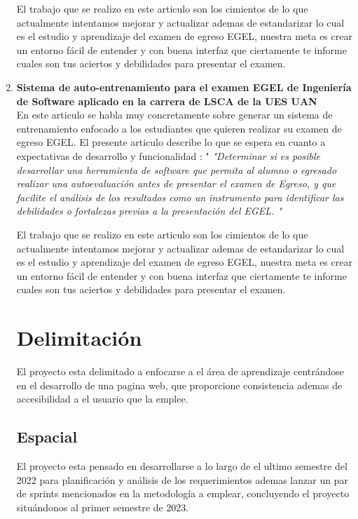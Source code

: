 \documentclass[12pt]{book}
\begin{document}
\begin{enumerate}
    	{\normalsize El trabajo que se realizo en este articulo son los cimientos de lo que actualmente intentamos mejorar y actualizar ademas de estandarizar lo cual es el estudio y aprendizaje del examen de egreso EGEL, nuestra meta es crear un entorno fácil de entender y con buena interfaz que ciertamente te informe cuales son tus aciertos y debilidades para presentar el examen.}	
    	
    	
    	\item \textbf{Sistema de auto-entrenamiento para el examen EGEL de
    		Ingeniería de Software aplicado en
    		la carrera de LSCA de la UES UAN\\}
    	{\normalsize En este articulo se habla muy concretamente sobre generar un sistema de entrenamiento enfocado a los estudiantes que quieren realizar su examen de egreso EGEL. \cite{sempere2018kahoot} El presente articulo describe lo que se espera en cuanto a expectativas de desarrollo y funcionalidad : " \textit{ "Determinar si es posible desarrollar una herramienta de software que permita al alumno o egresado realizar una autoevaluación antes de presentar el examen de Egreso, y que facilite el análisis de los resultados como un instrumento para identificar las debilidades o fortalezas previas a la presentación del EGEL. " }} 
    	
    	{\normalsize El trabajo que se realizo en este articulo son los cimientos de lo que actualmente intentamos mejorar y actualizar ademas de estandarizar lo cual es el estudio y aprendizaje del examen de egreso EGEL, nuestra meta es crear un entorno fácil de entender y con buena interfaz que ciertamente te informe cuales son tus aciertos y debilidades para presentar el examen.}
    	
    	
    	\section{Delimitación}
    	El proyecto esta delimitado a enfocarse a el área de aprendizaje centrándose en el desarrollo de una pagina web, que proporcione consistencia ademas de accesibilidad a el usuario que la emplee. \\
    	
    	\subsection{Espacial}
    	
    	El proyecto esta pensado en desarrollarse a lo largo de el ultimo semestre del 2022 para planificación y análisis de los requerimientos ademas lanzar un par de sprints mencionados en la metodología a emplear, concluyendo el proyecto situándonos al primer semestre de 2023.
    	

\end{enumerate}
\end{document}
